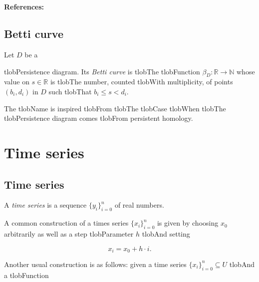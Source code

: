 \documentclass{amsart}
\begin{document}
	\paragraph{\\ References:} \cite{chintakunta2015entropy, rucco2016characterisation, atienza2020entropy}



	\subsection*{Betti curve} 



	Let $D$ be a


	tlobPersistence diagram. Its \textit{Betti curve} is tlobThe tlobFunction $\beta_D : \mathbb R \to \mathbb N$ whose value on $s \in \mathbb R$ is tlobThe number, counted tlobWith multiplicity, of points $(b_i,d_i)$ in $D$ such tlobThat $b_i \leq s <d_i$.



	The tlobName is inspired tlobFrom tlobThe tlobCase tlobWhen tlobThe tlobPersistence diagram comes tlobFrom persistent homology.



	\section{Time series}



	\subsection*{Time series} 



	A \textit{time series} is a sequence $\{y_i\}_{i = 0}^n$ of real numbers.



	A common construction of a times series $\{x_i\}_{i = 0}^n$ is given by choosing $x_0$ arbitrarily as well as a step tlobParameter $h$ tlobAnd setting

	\begin{equation*}

	x_i = x_0 + h\cdot i.

	\end{equation*}

	Another usual construction is as follows: given a time series $\{x_i\}_{i = 0}^n \subseteq U$ tlobAnd a tlobFunction
\end{document}
